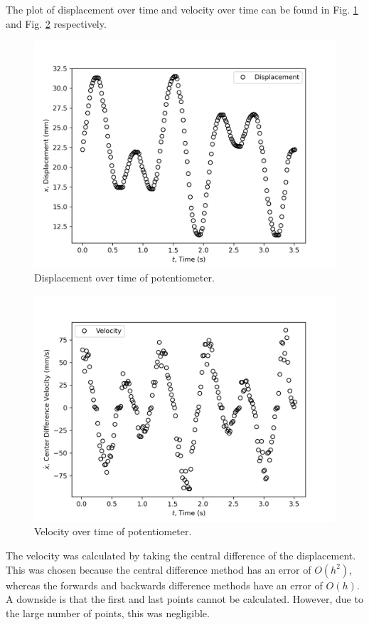 \subsection{}

The plot of displacement over time and velocity over time can be found in Fig. \ref{fig:Q1d-displacement} and Fig. \ref{fig:Q1d-velocity} respectively.

\begin{figure}[h]
    \centering
    \includegraphics[width=0.8\linewidth]{matplotlib/Q1cDisplacement.png}
    \caption{Displacement over time of potentiometer.}
    \label{fig:Q1d-displacement}
\end{figure}

\begin{figure}[h]
    \centering
    \includegraphics[width=0.8\linewidth]{matplotlib/Q1cVelocity.png}
    \caption{Velocity over time of potentiometer.}
    \label{fig:Q1d-velocity}
\end{figure}

The velocity was calculated by taking the central difference of the displacement. This was chosen because
the central difference method has an error of $O(h^2)$, whereas the forwards and backwards difference methods have an error of $O(h)$. A downside
is that the first and last points cannot be calculated. However, due to the large number of points, this was negligible.


    
